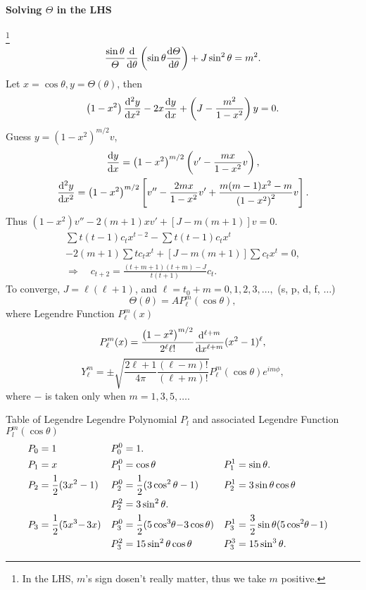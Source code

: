 \documentclass{article}
\def\d{{\rm d}}
\newcommand{\ko}[1]{\hspace{-#1 pt}}%
\newcommand{\ds}[2]{\frac{\d #1}{\d #2}}%
\newcommand{\sds}[2]{\frac{\d^2 #1}{\d #2^2}}
\newcommand{\kh}[1]{\left(#1\right)}
\newcommand{\fkh}[1]{\left[#1\right]}
\begin{document}
\paragraph{Solving $\varTheta$ in the LHS}\ko7\footnote{In the LHS, $m$'s sign dosen't really matter, thus we take $m$ positive.}
$$\frac{\sin\theta}\varTheta\ds{}\theta\kh{\sin\theta\ds\varTheta\theta}+J\sin^2\theta=m^2.$$
Let $x=\cos\theta,y=\varTheta(\theta)$, then
$$\kh{1-x^2}\sds yx-2x\ds yx+\kh{J-\frac{m^2}{1-x^2}}y=0.$$
Guess $y=\kh{1-x^2}^{m/2}v$,
\begin{gather*}
	\ds yx=\kh{1-x^2}^{m/2}\kh{v'-\frac{mx}{1-x^2}v},\\
	\sds yx=\kh{1-x^2}^{m/2}\fkh{v''-\frac{2mx}{1-x^2}v'+\frac{m(m-1)x^2-m}{\kh{1-x^2}^2}v}.
\end{gather*}
Thus $\kh{1-x^2}v''-2(m+1)xv'+\fkh{J-m(m+1)}v=0.$
\begin{gather*}
	\sum t(t-1)c_tx^{t-2}-\sum t(t-1)c_tx^t\\
	-2(m+1)\sum tc_tx^t+\fkh{J-m(m+1)}\sum c_tx^t=0,\\
	\Rightarrow\quad c_{t+2}=\frac{(t+m+1)(t+m)-J}{t(t+1)}c_t.
\end{gather*}
To converge, $J=\ell(\ell+1)$, and $\ell=t_0+m=0,1,2,3,\ldots,$ (s, p, d, f, $\ldots$)
$$\varTheta(\theta)=AP_\ell^m(\cos\theta),$$
where Legendre Function $P_\ell^m(x)$
$$P_\ell^m(x)=\frac{\kh{1-x^2}^{m/2}}{2^\ell\ell!}\frac{\d^{\ell+m}}{\d x^{\ell+m}}(x^2-1)^\ell,$$
$$Y_\ell^m=\pm\sqrt{\frac{2\ell+1}{4\pi}\frac{(\ell-m)!}{(\ell+m)!}}P_\ell^m(\cos\theta)e^{im\phi},$$
where $-$ is taken only when $m=1,3,5,\ldots.$
\begin{example}{Table of Legendre}{}
	Legendre Polynomial $P_l$ and associated Legendre Function $P_l^m(\cos\theta)$%
	\begin{align*}
		P_0 & =1                        & P_0^0 & =1.                                                                                                       \\
		P_1 & =x                        & P_1^0 & =\cos\theta                                     & P_1^1 & =\sin\theta.                                    \\
		P_2 & =\frac12(3x^2-1)          & P_2^0 & =\frac12(3\cos^2\theta-1)                       & P_2^1 & =3\sin\theta\cos\theta                          \\
		    &                           & P_2^2 & =3\sin^2\theta.                                                                                           \\
		P_3 & =\frac12(5x^3\ko2-\ko13x) & P_3^0 & =\frac12(5\cos^3\ko2\theta\ko2-\ko23\cos\theta) & P_3^1 & =\frac32\sin\theta(5\cos^2\ko2\theta\ko1-\ko11) \\
		    &                           & P_3^2 & =15\sin^2\theta\cos\theta                       & P_3^3 & =15\sin^3\theta.
	\end{align*}
\end{example}
\end{document}
